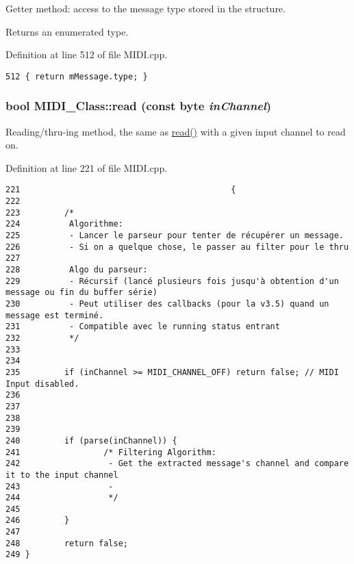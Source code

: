 Getter method: access to the message type stored in the structure. \par
 Returns an enumerated type. 

Definition at line 512 of file MIDI.cpp.

\begin{Code}\begin{verbatim}512 { return mMessage.type; }
\end{verbatim}
\end{Code}


\hypertarget{class_m_i_d_i___class_581b5b973cd81e5aa9d6b91c220342b7}{
\subsubsection[{read}]{\setlength{\rightskip}{0pt plus 5cm}bool MIDI\_\-Class::read (const byte {\em inChannel})}}
\label{class_m_i_d_i___class_581b5b973cd81e5aa9d6b91c220342b7}


Reading/thru-ing method, the same as \hyperlink{class_m_i_d_i___class_8e7be5af3a32cb91f596dbb8d8c297bf}{read()} with a given input channel to read on. 

Definition at line 221 of file MIDI.cpp.

\begin{Code}\begin{verbatim}221                                           {
222         
223         /*
224          Algorithme:
225          - Lancer le parseur pour tenter de récupérer un message.
226          - Si on a quelque chose, le passer au filter pour le thru
227          
228          Algo du parseur:
229          - Récursif (lancé plusieurs fois jusqu'à obtention d'un message ou fin du buffer série)
230          - Peut utiliser des callbacks (pour la v3.5) quand un message est terminé.
231          - Compatible avec le running status entrant 
232          */
233         
234         
235         if (inChannel >= MIDI_CHANNEL_OFF) return false; // MIDI Input disabled.
236         
237         
238         
239         
240         if (parse(inChannel)) {
241                 /* Filtering Algorithm:
242                  - Get the extracted message's channel and compare it to the input channel
243                  - 
244                  */
245                 
246         }
247         
248         return false;
249 }
\end{verbatim}
\end{Code}


